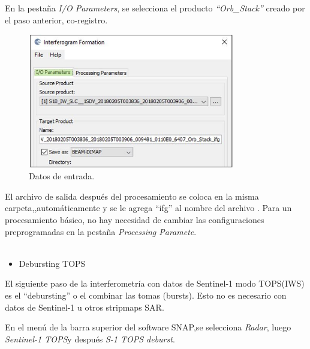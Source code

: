 \documentclass{article}
\begin{document}
    En la pestaña \textit{I/O Parameters}, se selecciona el producto \textit{“Orb\_Stack”} creado por el paso anterior,  co-registro.    %
\begin{figure}[htbp]
    \centering
    \includegraphics[width=9cm]{Imagen/07.JPG}
    \caption{Datos de entrada.}
    \label{fig:07}
    \end{figure}
    El archivo de salida después del procesamiento se coloca en la misma carpeta,,automáticamente y se le agrega “ifg” al nombre del archivo .
    Para un procesamiento básico, no hay necesidad de cambiar las configuraciones preprogramadas en la pestaña \textit{Processing Paramete}.\\ \\
    
\begin{itemize}
    \item Debursting TOPS
\end{itemize}
    El siguiente paso de la interferometría con datos de Sentinel-1 modo TOPS(IWS) es el “debursting” o el combinar las tomas (bursts). Esto no es necesario con datos de Sentinel-1 u otros stripmaps SAR.
    
    En el menú de la barra superior del software SNAP,se selecciona \textit{Radar}, luego \textit{Sentinel-1 TOPS}y después \textit{S-1 TOPS deburst}.
    
\end{document}
